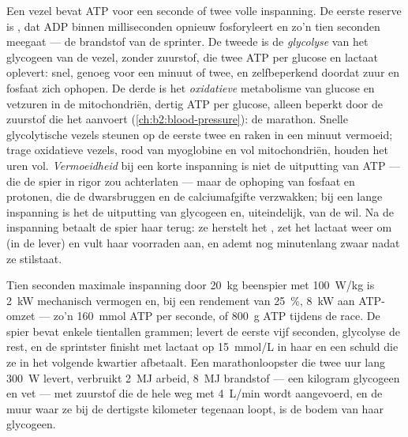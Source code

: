 \begin{proposition}\label{prop:b2:muscle-movement:energy}
Een vezel bevat ATP voor een seconde of twee volle inspanning. De eerste
reserve is \emph{}, dat ADP binnen milliseconden opnieuw
fosforyleert en zo'n tien seconden meegaat --- de brandstof van de sprinter.
De tweede is de \emph{glycolyse} van het glycogeen van de vezel, zonder
zuurstof, die twee ATP per glucose en lactaat oplevert: snel, genoeg voor een
minuut of twee, en zelfbeperkend doordat zuur en fosfaat zich ophopen. De
derde is het \emph{oxidatieve} metabolisme van glucose en vetzuren in de
mitochondriën, dertig ATP per glucose, alleen beperkt door de zuurstof die het
 aanvoert (\cref{ch:b2:blood-pressure}): de marathon. Snelle glycolytische
vezels steunen op de eerste twee en raken in een minuut vermoeid; trage
oxidatieve vezels, rood van myoglobine en vol mitochondriën, houden het uren
vol. \emph{Vermoeidheid} bij een korte inspanning is niet de uitputting van
ATP --- die de spier in rigor zou achterlaten --- maar de ophoping van fosfaat
en protonen, die de dwarsbruggen en de calciumafgifte verzwakken; bij een
lange inspanning is het de uitputting van glycogeen en, uiteindelijk, van de
wil. Na de inspanning betaalt de spier haar \emph{} terug: ze
herstelt het , zet het lactaat weer om (in de lever) en vult
haar voorraden aan, en ademt nog minutenlang zwaar nadat ze stilstaat.
\end{proposition}

\begin{example}\label{ex:b2:muscle-movement:sprint}
Tien seconden maximale inspanning door \qty{20}{kg} beenspier met
\qty{100}{W/kg} is \qty{2}{kW} mechanisch vermogen en, bij een rendement van
\qty{25}{\%}, \qty{8}{kW} aan ATP-omzet --- zo'n \qty{160}{mmol} ATP per
seconde, of \qty{800}{g} ATP tijdens de race. De spier bevat enkele tientallen
grammen;  levert de eerste vijf seconden, glycolyse de rest,
en de sprintster finisht met lactaat op \qty{15}{mmol/L} in haar  en een
schuld die ze in het volgende kwartier afbetaalt. Een marathonloopster die
twee uur lang \qty{300}{W} levert, verbruikt \qty{2}{MJ} arbeid, \qty{8}{MJ}
brandstof --- een kilogram glycogeen en vet --- met zuurstof die de hele weg
met \qty{4}{L/min} wordt aangevoerd, en de muur waar ze bij de dertigste
kilometer tegenaan loopt, is de bodem van haar glycogeen.
\end{example}

